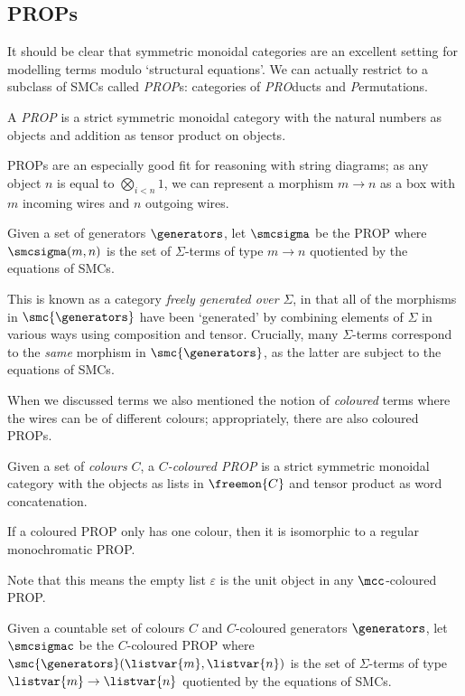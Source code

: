 \subsection{PROPs}

It should be clear that symmetric monoidal categories are an excellent setting
for modelling terms modulo `structural equations'.
We can actually restrict to a subclass of SMCs called \emph{PROP}s: categories
of \emph{PRO}ducts and \emph{P}ermutations.

\begin{definition}
    A \emph{PROP} is a strict symmetric monoidal category with the
    natural numbers as objects and addition as tensor product on objects.
\end{definition}

PROPs are an especially good fit for reasoning with string diagrams; as any
object \(n\) is equal to \(\bigotimes_{i < n} 1\), we can represent a morphism
\(m \to n\) as a box with \(m\) incoming wires and \(n\) outgoing wires.

\begin{definition}\label{def:freely-generated-prop}
    Given a set of generators \(\generators\), let \(\smcsigma\) be the
    PROP where \(\smcsigma(m, n)\) is the set of \(\Sigma\)-terms of type
    \(m \to n\) quotiented by the equations of SMCs.
\end{definition}

This is known as a category \emph{freely generated over} \(\Sigma\), in that all
of the morphisms in \(\smc{\generators}\) have been `generated' by combining
elements of \(\Sigma\) in various ways using composition and tensor.
Crucially, many \(\Sigma\)-terms correspond to the \emph{same} morphism in
\(\smc{\generators}\), as the latter are subject to the equations of SMCs.

When we discussed terms we also mentioned the notion of \emph{coloured} terms
where the wires can be of different colours; appropriately, there are also
coloured PROPs.

\begin{definition}
    Given a set of \emph{colours} \(C\), a \emph{\(C\)-coloured PROP} is a strict
    symmetric monoidal category with the objects as lists in \(\freemon{C}\) and
    tensor product as word concatenation.
\end{definition}

\begin{remark}
    If a coloured PROP only has one colour, then it is isomorphic to a regular
    monochromatic PROP.
\end{remark}

Note that this means the empty list \(\varepsilon\) is the unit
object in any \(\mcc\)-coloured PROP.

\begin{definition}\label{def:freely-generated-coloured-prop}
    Given a countable set of colours \(C\) and \(C\)-coloured generators
    \(\generators\), let \(\smcsigmac\) be the \(C\)-coloured PROP where
    \(\smc{\generators}(\listvar{m}, \listvar{n})\) is the set of
    \(\Sigma\)-terms of type \(\listvar{m} \to \listvar{n}\) quotiented by
    the equations of SMCs.
\end{definition}

